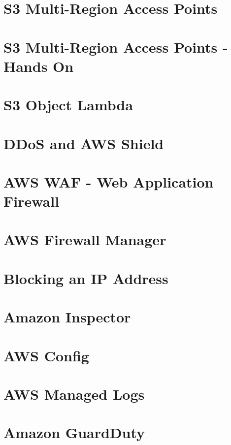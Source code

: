 \documentclass[11pt]{book}
\begin{document}
    \section{S3 Multi-Region Access Points}


    \section{S3 Multi-Region Access Points - Hands On}


    \section{S3 Object Lambda}


    \section{DDoS and AWS Shield}


    \section{AWS WAF - Web Application Firewall}


    \section{AWS Firewall Manager}


    \section{Blocking an IP Address}


    \section{Amazon Inspector}


    \section{AWS Config}


    \section{AWS Managed Logs}


    \section{Amazon GuardDuty}
\end{document}
